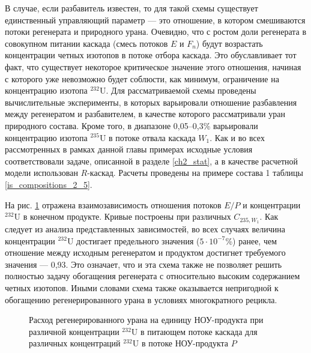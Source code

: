 В случае, если разбавитель известен, то для такой схемы существует единственный управляющий параметр --- это отношение, в котором смешиваются потоки регенерата и природного урана. Очевидно, что с ростом доли регенерата в совокупном питании каскада (смесь потоков $E$ и $F_n$) будут возрастать концентрации четных изотопов в потоке отбора каскада. Это обуславливает тот факт, что существует некоторое критическое значение этого отношения, начиная с которого уже невозможно будет соблюсти, как минимум, ограничение на концентрацию изотопа $^{232}$U. Для рассматриваемой схемы проведены вычислительные эксперименты, в которых варьировали отношение разбавления между регенератом и разбавителем, в качестве которого рассматривали уран природного состава. Кроме того, в диапазоне 0,05--0,3\% варьировали концентрацию изотопа $^{235}$U в потоке отвала каскада $W_1$. Как и во всех рассмотренных в рамках данной главы примерах исходные условия соответствовали задаче, описанной в разделе \ref{ch2_stat}, а в качестве расчетной модели использован $R$-каскад. Расчеты проведены на примере состава 1 таблицы \ref{is_compositions_2_5}. 

На рис. \ref{sc3_1.second} отражена взаимозависимость отношения потоков $E/P$ и концентрации $^{232}$U в конечном продукте. Кривые построены при различных $C_{235, W_1}$. Как следует из анализа представленных зависимостей, во всех случаях величина концентрации  $^{232}$U достигает предельного значения ($5\cdot10^{-7}$\%) ранее, чем отношение между исходным регенератом и продуктом достигнет требуемого значения --- 0,93. Это означает, что и эта схема также не позволяет решить полностью задачу обогащения регенерата с относительно высоким содержанием четных изотопов. Иными словами схема также оказывается непригодной к обогащению регенерированного урана в условиях многократного рецикла.

\begin{figure}[ht]
  \caption{Расход регенерированного урана на единицу НОУ-продукта при различной концентрации $^{232}$U в питающем потоке каскада для различных концентраций $^{232}$U в потоке НОУ-продукта $P$}\label{sc3_1.second}
\end{figure}

